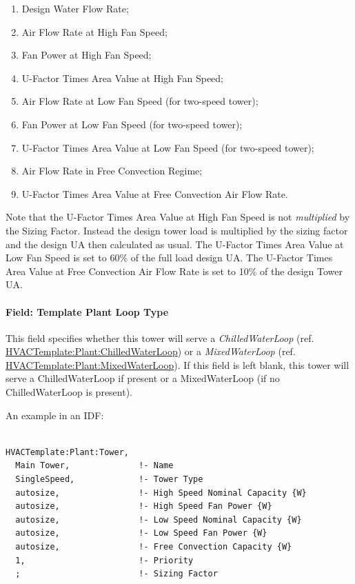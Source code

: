 \begin{enumerate}
\def\labelenumi{\arabic{enumi}.}
\item
  Design Water Flow Rate;
\item
  Air Flow Rate at High Fan Speed;
\item
  Fan Power at High Fan Speed;
\item
  U-Factor Times Area Value at High Fan Speed;
\item
  Air Flow Rate at Low Fan Speed (for two-speed tower);
\item
  Fan Power at Low Fan Speed (for two-speed tower);
\item
  U-Factor Times Area Value at Low Fan Speed (for two-speed tower);
\item
  Air Flow Rate in Free Convection Regime;
\item
  U-Factor Times Area Value at Free Convection Air Flow Rate.
\end{enumerate}

Note that the U-Factor Times Area Value at High Fan Speed is not \emph{multiplied} by the Sizing Factor. Instead the design tower load is multiplied by the sizing factor and the design UA then calculated as usual. The U-Factor Times Area Value at Low Fan Speed is set to 60\% of the full load design UA. The U-Factor Times Area Value at Free Convection Air Flow Rate is set to 10\% of the design Tower UA.

\paragraph{Field: Template Plant Loop Type}\label{field-template-plant-loop-type}

This field specifies whether this tower will serve a \emph{ChilledWaterLoop} (ref. \hyperref[hvactemplateplantchilledwaterloop]{HVACTemplate:Plant:ChilledWaterLoop}) or a \emph{MixedWaterLoop} (ref. \hyperref[hvactemplateplantmixedwaterloop]{HVACTemplate:Plant:MixedWaterLoop}). If this field is left blank, this tower will serve a ChilledWaterLoop if present or a MixedWaterLoop (if no ChilledWaterLoop is present).

An example in an IDF:

\begin{lstlisting}

HVACTemplate:Plant:Tower,
  Main Tower,              !- Name
  SingleSpeed,             !- Tower Type
  autosize,                !- High Speed Nominal Capacity {W}
  autosize,                !- High Speed Fan Power {W}
  autosize,                !- Low Speed Nominal Capacity {W}
  autosize,                !- Low Speed Fan Power {W}
  autosize,                !- Free Convection Capacity {W}
  1,                       !- Priority
  ;                        !- Sizing Factor
\end{lstlisting}

